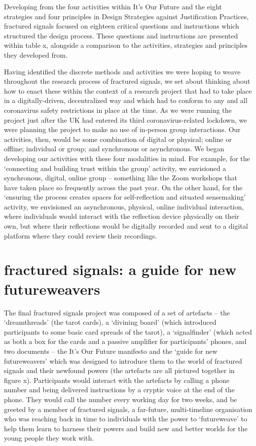 Developing from the four activities within It’s Our Future and the eight strategies and four principles in Design Strategies against Justification Practices, fractured signals focused on eighteen critical questions and instructions which structured the design process. These questions and instructions are presented within table x, alongside a comparison to the activities, strategies and principles they developed from. 


Having identified the discrete methods and activities we were hoping to weave throughout the research process of fractured signals, we set about thinking about how to enact these within the context of a research project that had to take place in a digitally-driven, decentralized way and which had to conform to any and all coronavirus safety restrictions in place at the time. As we were running the project just after the UK had entered its third coronavirus-related lockdown, we were planning the project to make no use of in-person group interactions. Our activities, then, would be some combination of digital or physical; online or offline; individual or group; and synchronous or asynchronous. We began developing our activities with these four modalities in mind. For example, for the  ‘connecting and building trust within the group’ activity, we envisioned a synchronous, digital, online group – something like the Zoom workshops that have taken place so frequently across the past year. On the other hand,  for the ‘ensuring the process creates spaces for self-reflection and situated sensemaking’ activity, we envisioned an asynchronous, physical, online individual interaction, where individuals would interact with the reflection device physically on their own, but where their reflections would be digitally recorded and sent to a digital platform where they could review their recordings. 

\section{fractured signals: a guide for new futureweavers}

The final fractured signals project was composed of a set of artefacts – the ‘dreamthreads’ (the tarot cards), a ‘divining board’ (which introduced  participants to some basic card spreads of the tarot), a ‘signalfinder’ (which acted as both a box for the cards and a passive amplifier for participants’ phones, and two documents – the It’s Our Future manifesto and the ‘guide for new futureweavers’ which was designed to introduce them to the world of fractured signals and their newfound powers (the artefacts are all pictured together in figure x).   Participants would interact with the artefacts by calling a phone number and being delivered instructions by a cryptic voice at the end of the phone. They would call the number every working day for two weeks, and be greeted by a member of fractured signals, a far-future, multi-timeline organisation who was reaching back in time to individuals with the power to ‘futureweave’ to help them learn to harness their powers and build new and better worlds for the young people they work with. 

